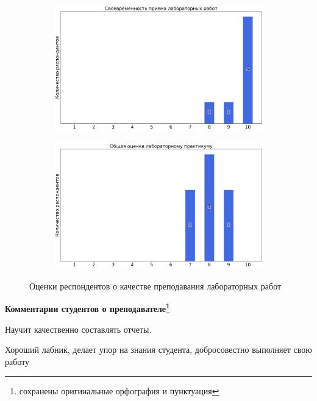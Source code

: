 \begin{figure}[H]
\begin{subfigure}[b]{0.45\textwidth}
                \includegraphics[width=\textwidth]{images/1 course/Общая физика - механика/labniks-marks-Яворский В.А.-2.png}
            \end{subfigure}
            \begin{subfigure}[b]{0.45\textwidth}
                \centering
                \includegraphics[width=\textwidth]{images/1 course/Общая физика - механика/labniks-marks-Яворский В.А.-3.png}
            \end{subfigure}	
            \caption{Оценки респондентов о качестве преподавания лабораторных работ}
        \end{figure}

        \textbf{Комментарии студентов о преподавателе\protect\footnote{сохранены оригинальные орфография и пунктуация}}
            \begin{commentbox} 
                Научит качественно составлять отчеты. 
            \end{commentbox} 
        
            \begin{commentbox} 
                Хороший лабник, делает упор на знания студента, добросовестно выполняет свою работу 
            \end{commentbox} 
        
